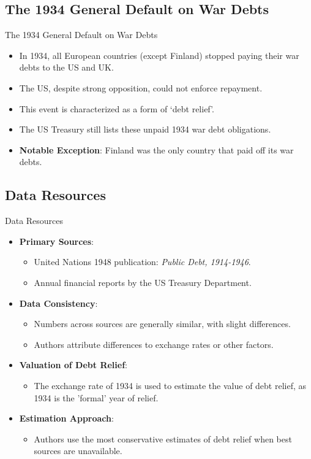 \documentclass{beamer}
\begin{document}
\subsection{The 1934 General Default on War Debts}
\begin{frame}{The 1934 General Default on War Debts}
  \label{sec:1934generaldefault}
  \begin{itemize}
    \item In 1934, all European countries (except Finland) stopped paying their war debts to the US and UK.
    \item The US, despite strong opposition, could not enforce repayment.
    \item This event is characterized as a form of `debt relief'.
    \item The US Treasury still lists these unpaid 1934 war debt obligations.
    \item \textbf{Notable Exception}: Finland was the only country that paid off its war debts.
  \end{itemize}
\end{frame}

\subsection{Data Resources}
\begin{frame}{Data Resources}
  \begin{itemize}
    \item \textbf{Primary Sources}:
    \begin{itemize}
        \item United Nations 1948 publication: \textit{Public Debt, 1914-1946}.
        \item Annual financial reports by the US Treasury Department.
    \end{itemize}
    \item \textbf{Data Consistency}:
    \begin{itemize}
        \item Numbers across sources are generally similar, with slight differences.
        \item Authors attribute differences to exchange rates or other factors.
    \end{itemize}
    \item \textbf{Valuation of Debt Relief}:
    \begin{itemize}
        \item The exchange rate of 1934 is used to estimate the value of debt relief, as 1934 is the 'formal' year of relief.
    \end{itemize}
    \item \textbf{Estimation Approach}:
    \begin{itemize}
        \item Authors use the most conservative estimates of debt relief when best sources are unavailable.
    \end{itemize}
  \end{itemize}
\end{frame}
\end{document}
